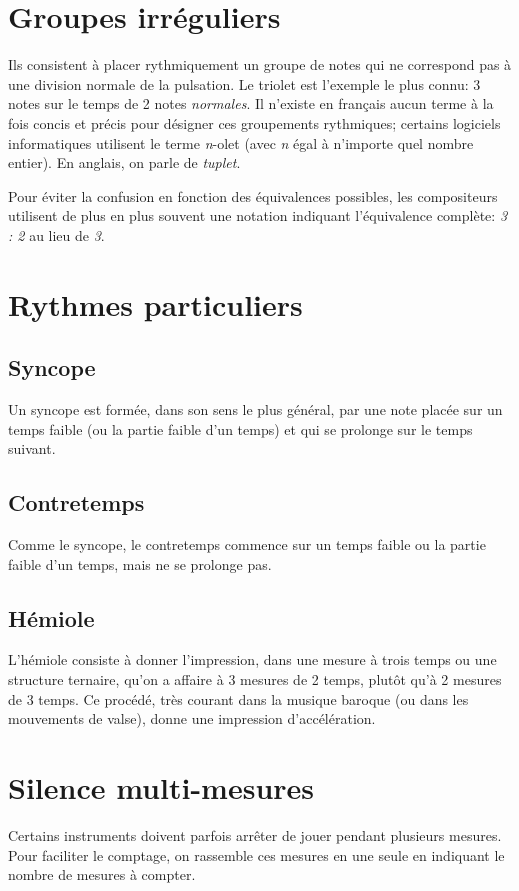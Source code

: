 \documentclass[11pt,a4paper]{scrreprt}
\begin{document}
\section{Groupes irréguliers}
Ils consistent à placer rythmiquement un groupe de notes qui ne correspond pas à une division normale de la pulsation. Le triolet est l'exemple le plus connu: 3 notes sur le temps de 2 notes \emph{normales}.
Il n'existe en français aucun terme à la fois concis et précis pour désigner ces groupements rythmiques; certains logiciels informatiques utilisent le terme \emph{n}-olet (avec \emph{n} égal à n'importe quel nombre entier). En anglais, on parle de \emph{tuplet}.

Pour éviter la confusion en fonction des équivalences possibles, les compositeurs utilisent de plus en plus souvent une notation indiquant l'équivalence complète: \emph{3 : 2} au lieu de \emph{3}.

\section{Rythmes particuliers}
\subsection{Syncope}
Un syncope est formée, dans son sens le plus général, par une note placée sur un temps faible (ou la partie faible d'un temps) et qui se prolonge sur le temps suivant. 
\subsection{Contretemps}
Comme le syncope, le contretemps commence sur un temps faible ou la partie faible d'un temps, mais ne se prolonge pas.
\subsection{Hémiole}
L'hémiole consiste à donner l'impression, dans une mesure à trois temps ou une structure ternaire, qu'on a affaire à 3 mesures de 2 temps, plutôt qu'à 2 mesures de 3 temps. Ce procédé, très courant dans la musique baroque (ou dans les mouvements de valse), donne une impression d'accélération.

\section{Silence multi-mesures}
Certains instruments doivent parfois arrêter de jouer pendant plusieurs mesures. Pour faciliter le comptage, on rassemble ces mesures en une seule en indiquant le nombre de mesures à compter.
\end{document}
